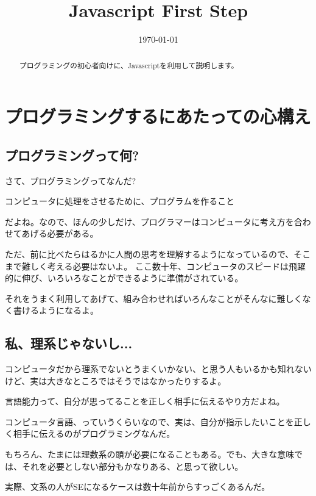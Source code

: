 \documentclass[mingoth,11pt,a4j,uplatex]{jsarticle}
\title{Javascript First Step}
\date{\today}
\begin{document}

\maketitle

\begin{abstract}
プログラミングの初心者向けに、Javascriptを利用して説明します。
\end{abstract}

\tableofcontents
\newpage

\section{プログラミングするにあたっての心構え}
\subsection{プログラミングって何?}
さて、プログラミングってなんだ?
\begin{center}
コンピュータに処理をさせるために、プログラムを作ること
\end{center}

だよね。なので、ほんの少しだけ、プログラマーはコンピュータに考え方を合わせてあげる必要がある。

ただ、前に比べたらはるかに人間の思考を理解するようになっているので、そこまで難しく考える必要はないよ。 ここ数十年、コンピュータのスピードは飛躍的に伸び、いろいろなことができるように準備がされている。

それをうまく利用してあげて、組み合わせればいろんなことがそんなに難しくなく書けるようになるよ。

\subsection{私、理系じゃないし...}
コンピュータだから理系でないとうまくいかない、と思う人もいるかも知れないけど、実は大きなところではそうではなかったりするよ。

言語能力って、自分が思ってることを正しく相手に伝えるやり方だよね。

コンピュータ言語、っていうくらいなので、実は、自分が指示したいことを正しく相手に伝えるのがプログラミングなんだ。

もちろん、たまには理数系の頭が必要になることもある。でも、大きな意味では、それを必要としない部分もかなりある、と思って欲しい。


実際、文系の人がSEになるケースは数十年前からすっごくあるんだ。
\end{document}
